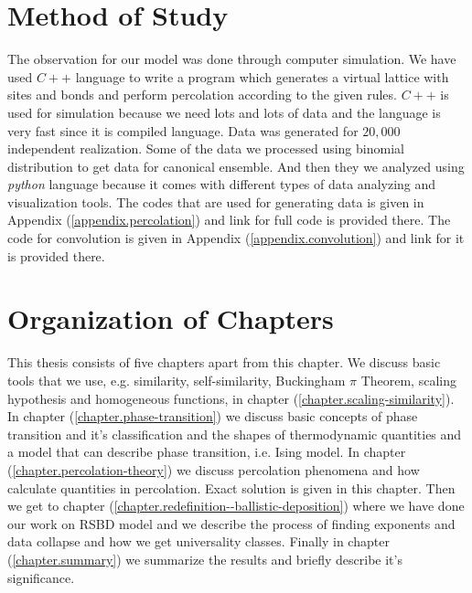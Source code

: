 \section{Method of Study}  %
The observation for our model was done through computer simulation. We have used $C++$ language to write a program which generates a virtual lattice with sites and bonds and perform percolation according to the given rules. $C++$ is used for simulation because we need lots and lots of data and the language is very fast since it is compiled language. Data was generated for $20,000$ independent realization. Some of the data we processed using binomial distribution \cite{Newman2001} to get data for canonical ensemble. And then they we analyzed using \textit{python} language because it comes with different types of data analyzing and visualization tools. The codes that are used for generating data is given in Appendix (\ref{appendix.percolation}) and link for full code is provided there. The code for convolution is given in Appendix (\ref{appendix.convolution}) and link for it is provided there.

\section{Organization of Chapters}
	This thesis consists of five chapters apart from this chapter. We discuss basic tools that we use, e.g. similarity, self-similarity, Buckingham $\pi$ Theorem, scaling hypothesis and homogeneous functions, in chapter (\ref{chapter.scaling-similarity}). In chapter (\ref{chapter.phase-transition}) we discuss basic concepts of phase transition and it's classification and the shapes of thermodynamic quantities and a model that can describe phase transition, i.e. Ising model. In chapter (\ref{chapter.percolation-theory}) we discuss percolation phenomena and how calculate quantities in percolation. Exact solution is given in this chapter. Then we get to chapter (\ref{chapter.redefinition--ballistic-deposition}) where we have done our work on RSBD model and we describe the process of finding exponents and data collapse and how we get universality classes. Finally in chapter (\ref{chapter.summary}) we summarize the results and briefly describe it's significance.

